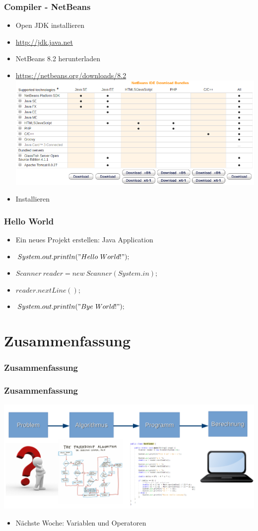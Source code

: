 \documentclass{beamer}
\begin{document}
	\begin{frame}
		\frametitle{Compiler - NetBeans}
		\begin{itemize}
			\item Open JDK installieren
			\item \url{http://jdk.java.net}
			\item NetBeans 8.2 herunterladen
			\item \url{https://netbeans.org/downloads/8.2}
			\includegraphics[width=.5\textwidth]{Netbeans-Download}
			\item Installieren
		\end{itemize}
	\end{frame}

	\begin{frame}
		\frametitle{Hello World}
		\begin{itemize}
			\item Ein neues Projekt erstellen: Java Application
			\item $System.out.println("Hello\ World!");$
			\pause
			\item $Scanner\ reader = new\ Scanner(System.in);$
			\item $reader.nextLine();$
			\pause
			\item $System.out.println("Bye\ World!");$
		\end{itemize}
	\end{frame}

	\section{Zusammenfassung}
	\begin{frame}
		\frametitle{Zusammenfassung}
	\end{frame}

	\begin{frame}
		\frametitle{Zusammenfassung}
		\includegraphics[width=\textwidth]{Alg-Prog-Schema}
		\begin{itemize}
			\item Nächste Woche: Variablen und Operatoren
		\end{itemize}
	\end{frame}
\end{document}
